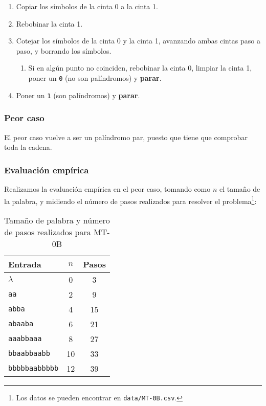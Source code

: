 \begin{enumerate}
    \item Copiar los símbolos de la cinta 0 a la cinta 1.
    \item Rebobinar la cinta 1.
    \item Cotejar los símbolos de la cinta 0 y la cinta 1, avanzando ambas cintas paso a paso, y borrando los símbolos.
    \begin{enumerate}[1.]
        \item Si en algún punto no coinciden, rebobinar la cinta 0, limpiar la cinta 1, poner un \texttt{0} (no son palíndromos) y \textbf{parar}.
    \end{enumerate}
    \item Poner un \texttt{1} (son palíndromos) y \textbf{parar}.
\end{enumerate}




\subsubsection*{Peor caso}
El peor caso vuelve a ser un palíndromo par, puesto que tiene que comprobar toda la cadena.

\subsubsection*{Evaluación empírica}
Realizamos la evaluación empírica en el peor caso, tomando como $n$ el tamaño de la palabra, y midiendo el número de pasos realizados para resolver el problema\footnote{Los datos se pueden encontrar en \texttt{data/MT-0B.csv}.}:

\begin{table}[h]
    \centering
    \begin{tabular}{lcc}
        Entrada & $n$ & Pasos \\
        \hline
        $\lambda$               & 0  & 3  \\
        \texttt{aa}             & 2  & 9  \\
        \texttt{abba}           & 4  & 15 \\
        \texttt{abaaba}         & 6  & 21 \\
        \texttt{aaabbaaa}       & 8  & 27 \\
        \texttt{bbaabbaabb}     & 10 & 33 \\
        \texttt{bbbbbaabbbbb}   & 12 & 39
    \end{tabular}
    \caption{Tamaño de palabra y número de pasos realizados para MT-0B}
\end{table}


